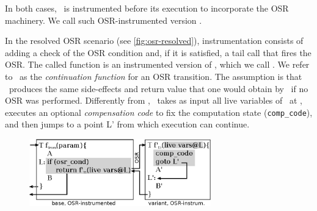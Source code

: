 \noindent In both cases, \fbase\ is instrumented before its execution to incorporate the OSR machinery. We call such OSR-instrumented version \fosrfrom.

In the resolved OSR scenario (see \myfigure\ref{fig:osr-resolved}), instrumentation consists of adding a check of the OSR condition and, if it is satisfied, a tail call that fires the OSR. The called function is an instrumented version of \fvariant, which we call \fosrto. We refer to \fosrto\ as the {\em continuation function} for an OSR transition. The assumption is that \fosrto\ produces the same side-effects and return value that one would obtain by \fbase\ if no OSR was performed. Differently from \fvariant, \fosrto\ takes as input all live variables of \fbase\ at \osrpoint, executes an optional {\em compensation code} to fix the computation state ({\tt comp\_code}), and then jumps to a point \textsf{L'} from which execution can continue.

\ifdefined\noauthorea
\begin{figure}[b]
\begin{center}
\includegraphics[width=0.7\textwidth]{figures/osr-resolved/osr-resolved.eps}
\caption{\protect}
\end{center}
\end{figure}
\fi


